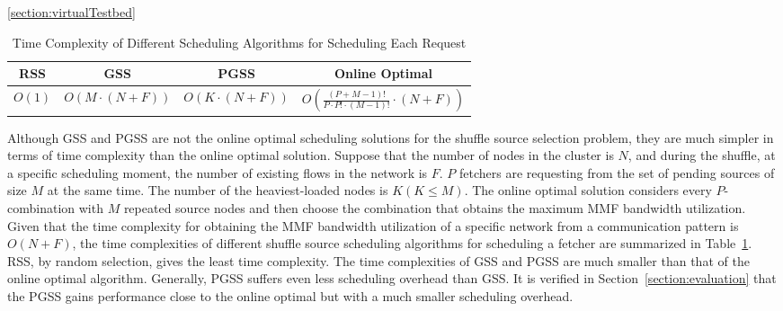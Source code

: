 \documentclass[10pt,journal,compsoc]{IEEEtran}
\begin{document}

\ref{section:virtualTestbed}

\begin{table}[!t]
\renewcommand{\arraystretch}{1}
\setlength\tabcolsep{1.5pt}
\caption{Time Complexity of Different Scheduling Algorithms for Scheduling Each Request}
\label{table:complexity}
\centering
\begin{tabularx}{.47\textwidth}{c|c|c|c}
\hline
\textbf{RSS} & \textbf{GSS} & \textbf{PGSS} &\textbf{Online Optimal}\\
\hline
$O(1)$ & $O(M \cdot (N+F))$ &
$O(K \cdot (N+F))$ &$O(\frac{(P+M-1)!}{P \cdot P! \cdot(M-1)!} \cdot (N+F))$\\
\hline
\end{tabularx}
\end{table}

Although GSS and PGSS are not the online optimal scheduling solutions for the
shuffle source selection problem,
they are much simpler in terms of time complexity than the online
optimal solution. 
Suppose that the number of nodes in the cluster is $N$,
and during the shuffle, at a specific scheduling moment, 
the number of existing flows in the network is $F$.
$P$ fetchers are
requesting from the set of pending sources of size $M$ at the same time.
The number of the heaviest-loaded nodes is $K(K \leq M)$.
The online optimal solution considers every $P$-combination with $M$ repeated source nodes and then choose the combination that obtains the maximum MMF bandwidth utilization.  
Given that the time complexity for obtaining the MMF
bandwidth utilization
of a specific network from a communication pattern is $O(N+F)$, 
the time complexities of different shuffle source scheduling algorithms for scheduling a fetcher are summarized in Table~\ref{table:complexity}.
RSS, by random selection, gives the least time complexity. 
The time complexities of GSS and PGSS are much smaller than that of the online optimal algorithm.
Generally, PGSS suffers even less scheduling overhead than GSS. 
It is verified in Section~\ref{section:evaluation} that the PGSS
gains performance close to the online optimal but with a much smaller scheduling overhead.
\end{document}
